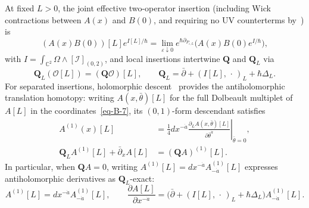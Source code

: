 \documentclass[11pt]{article}
\numberwithin{equation}{section}
\numberwithin{figure}{section}
\numberwithin{table}{section}
\begin{document}
At fixed $L>0$, the joint effective two-operator insertion (including Wick contractions between $A(x)$ and $B(0)$, and requiring no UV counterterms by~\cite{Wang}) is
\begin{equation}\label{eq-product-joint-effective}
(A(x)B(0))[L]e^{I[L]/\hbar}
=\lim_{\varepsilon\downarrow0}
e^{\hbar\partial_{P_{\varepsilon,L}}}
\bigl(A(x)B(0)e^{I/\hbar}\bigr),
\end{equation}
with $I=\int_{\mathbb C^2}\Omega\wedge[\mathcal I]_{(0,2)}$, and local insertions intertwine $\mathbf Q$ and $\mathbf Q_L$ via
\begin{equation}\label{eq-product-local-Ward}
\mathbf Q_L(\mathcal O[L])=(\mathbf Q\mathcal O)[L],
\qquad
\mathbf Q_L=\bar\partial+(I[L],\,\cdot\,)_L+\hbar\Delta_L.
\end{equation}
For separated insertions, holomorphic descent~\cite[Sections 2.2--2.3]{semichiral} provides the antiholomorphic translation homotopy: writing $A(x,\bar\theta)[L]$ for the full Dolbeault multiplet of $A[L]$ in the coordinates~\eqref{eq-B-7}, its $(0,1)$-form descendant satisfies
\begin{equation}\label{eq-ring-descendant}
\begin{aligned}
A^{(1)}(x)[L]
&=\frac14dx^{-\dot a}
\left.\frac{\partial_L A(x,\bar\theta)[L]}{\partial\bar\theta^{\dot a}}
\right|_{\bar\theta=0},\\
\mathbf Q_L A^{(1)}[L]+\bar\partial_x A[L]&=(\mathbf QA)^{(1)}[L].
\end{aligned}
\end{equation}
In particular, when $\mathbf QA=0$, writing $A^{(1)}[L]=dx^{-\dot a}A^{(1)}_{-\dot a}[L]$ expresses antiholomorphic derivatives as $\mathbf Q_L$-exact:
\begin{equation}\label{eq-ring-descendant-component}
A^{(1)}[L]=dx^{-\dot a}A^{(1)}_{-\dot a}[L],\qquad
\frac{\partial A[L]}{\partial x^{-\dot a}}
=\bigl(\bar\partial+(I[L],\,\cdot\,)_L+\hbar\Delta_L\bigr)
A^{(1)}_{-\dot a}[L].
\end{equation}
\end{document}
